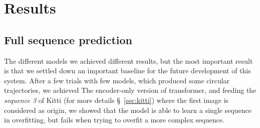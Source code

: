 \section{Results}\label{sec:results}


\subsection{Full sequence prediction}\label{subsec:full-sequence-prediction}
The different models we achieved different results, but the most important result is that we settled down an important baseline for the future development of this system.
After a few trials with few models, which produced some circular trajectories, we achieved
The encoder-only version of transformer, and feeding the \textit{sequence 3} of Kitti (for more details \S~\ref{sec:kitti}) where the first image is considered as origin, we showed that the model is able to learn a single sequence in overfitting, but fails when trying to overfit a more complex sequence.

